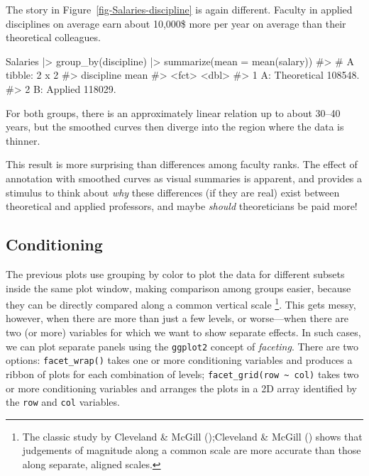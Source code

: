 \documentclass[
  letterpaper,
  10pt,
  krantz2]{krantz}
\makeatletter
\newenvironment{Shaded}{\begin{snugshade}}{\end{snugshade}}
\newcommand{\AttributeTok}[1]{\textcolor[rgb]{0.40,0.45,0.13}{#1}}
\newcommand{\CommentTok}[1]{\textcolor[rgb]{0.37,0.37,0.37}{#1}}
\newcommand{\FunctionTok}[1]{\textcolor[rgb]{0.28,0.35,0.67}{#1}}
\newcommand{\NormalTok}[1]{\textcolor[rgb]{0.00,0.23,0.31}{#1}}
\newcommand{\SpecialCharTok}[1]{\textcolor[rgb]{0.37,0.37,0.37}{#1}}
\newenvironment{kframe}{%
  \medskip{}
  \setlength{\fboxsep}{.8em}
  \def\at@end@of@kframe{}%
  \ifinner\ifhmode%
  \def\at@end@of@kframe{\end{minipage}}%
  \begin{minipage}{\columnwidth}%
  \fi\fi%
  \def\FrameCommand##1{\hskip\@totalleftmargin \hskip-\fboxsep
  \colorbox{shadecolor}{##1}\hskip-\fboxsep
      \hskip-\linewidth \hskip-\@totalleftmargin \hskip\columnwidth}%
  \MakeFramed {\advance\hsize-\width
    \@totalleftmargin\z@ \linewidth\hsize
    \@setminipage}}%
{\par\unskip\endMakeFramed%
  \at@end@of@kframe}
\renewenvironment{Shaded}{\begin{kframe}}{\end{kframe}}
\makeatother
\begin{document}
The story in Figure~\ref{fig-Salaries-discipline} is again different.
Faculty in applied disciplines on average earn about 10,000\$ more per
year on average than their theoretical colleagues.

\begin{Shaded}
\begin{Highlighting}[]
\NormalTok{Salaries }\SpecialCharTok{|\textgreater{}}
  \FunctionTok{group\_by}\NormalTok{(discipline) }\SpecialCharTok{|\textgreater{}}
  \FunctionTok{summarize}\NormalTok{(}\AttributeTok{mean =} \FunctionTok{mean}\NormalTok{(salary)) }
\CommentTok{\#\textgreater{} \# A tibble: 2 x 2}
\CommentTok{\#\textgreater{}   discipline        mean}
\CommentTok{\#\textgreater{}   \textless{}fct\textgreater{}            \textless{}dbl\textgreater{}}
\CommentTok{\#\textgreater{} 1 A: Theoretical 108548.}
\CommentTok{\#\textgreater{} 2 B: Applied     118029.}
\end{Highlighting}
\end{Shaded}

For both groups, there is an approximately linear relation up to about
30--40 years, but the smoothed curves then diverge into the region where
the data is thinner.

This result is more surprising than differences among faculty ranks. The
effect of annotation with smoothed curves as visual summaries is
apparent, and provides a stimulus to think about \emph{why} these
differences (if they are real) exist between theoretical and applied
professors, and maybe \emph{should} theoreticians be paid more!

\subsection{Conditioning}\label{conditioning}

The previous plots use grouping by color to plot the data for different
subsets inside the same plot window, making comparison among groups
easier, because they can be directly compared along a common vertical
scale \footnote{The classic study by Cleveland \& McGill
  ();Cleveland \& McGill
  () shows that judgements of
  magnitude along a common scale are more accurate than those along
  separate, aligned scales.}. This gets messy, however, when there are
more than just a few levels, or worse---when there are two (or more)
variables for which we want to show separate effects. In such cases, we
can plot separate panels using the \texttt{ggplot2} concept of
\emph{faceting}. There are two options: \texttt{facet\_wrap()} takes one
or more conditioning variables and produces a ribbon of plots for each
combination of levels; \texttt{facet\_grid(row\ \textasciitilde{}\ col)}
takes two or more conditioning variables and arranges the plots in a 2D
array identified by the \texttt{row} and \texttt{col} variables.
\end{document}
